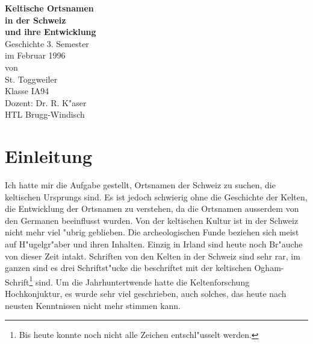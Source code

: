 \documentclass[10pt]{article}
\begin{document}
\begin{titlepage}
\begin{center}
\vspace*{30mm}
{\huge \bf Keltische Ortsnamen}\vspace{8mm}\\

{\huge \bf in der Schweiz}\vspace{8mm}\\

{\LARGE \bf und ihre Entwicklung}\vspace{60mm}\\

{\Large Geschichte 3. Semester}\vspace{6mm}\\

{\large im Februar 1996}\vspace{10mm}\\

{\large von}\vspace{6mm}\\
{\Large St. Toggweiler}\vspace{6mm}\\
{\large Klasse IA94}\vspace{10mm}\\

{\large Dozent: Dr. R. K"aser}\vspace{8mm}\\
{\large HTL Brugg-Windisch}

\end{center}
\end{titlepage}


\tableofcontents
\newpage



\setlength{\parskip}{0.6em}           %

\section*{Einleitung}
Ich hatte mir die Aufgabe gestellt, Ortsnamen der Schweiz zu suchen, die
keltischen Ursprungs sind. Es ist jedoch schwierig ohne die Geschichte
der Kelten, die Entwicklung der Ortsnamen zu verstehen, da die Ortsnamen ausserdem
von den Germanen beeinflusst wurden. Von der keltischen Kultur ist in der
Schweiz nicht mehr viel "ubrig geblieben. Die archeologischen Funde 
beziehen sich meist auf H"ugelgr"aber und ihren Inhalten. Einzig in
Irland sind heute noch Br"auche von dieser Zeit intakt. Schriften von
den Kelten in der Schweiz sind sehr rar, im ganzen sind es drei
Schriftst"ucke die beschriftet mit der keltischen Ogham-Schrift\footnote{Bis heute
konnte noch nicht alle Zeichen entschl"usselt werden.} sind. Um die Jahrhuntertwende
hatte die Keltenforschung Hochkonjuktur, es wurde sehr viel geschrieben,
auch solches, das heute nach neusten Kenntnissen nicht mehr stimmen kann.
\end{document}
